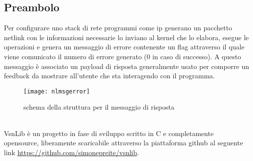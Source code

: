 \subsection{Preambolo}
Per configurare uno stack di rete programmi come ip generano un pacchetto netlink con le informazioni necessarie lo inviano al kernel che lo elabora, esegue le operazioni e genera un messaggio di errore contenente un flag attraverso il quale viene comunicato il numero di errore generato (0 in caso di successo). A questo messaggio \`e associato un payload di risposta generalmente usato per comporre un feedback da mostrare all'utente che sta interagendo con il programma.\\
\begin{figure}[h]                       %
\begin{center}                          %
\texttt{[image: nlmsgerror]}%
%
\caption[struct nlmserror]{schema della struttura per il messaggio di risposta}
\end{center}
\end{figure}\\
VsnLib \`e un progetto in fase di sviluppo scritto in C e completamente opensource, liberamente scaricabile attraverso la piattaforma github al seguente link \url{https://github.com/simonepreite/vsnlib}.

